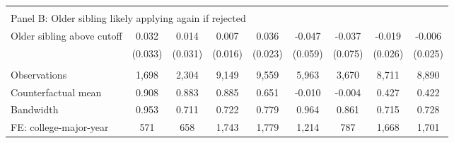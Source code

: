 {{\begin{tabular}{lcccccccc}
&  &  &  & & & & & &    \\
\multicolumn{9}{l}{Panel B: Older sibling likely applying again if rejected} \\
Older sibling above cutoff&       0.032   &       0.014   &       0.007   &       0.036   &      -0.047   &      -0.037   &      -0.019   &      -0.006   \\
                    &     (0.033)   &     (0.031)   &     (0.016)   &     (0.023)   &     (0.059)   &     (0.075)   &     (0.026)   &     (0.025)   \\
                    &               &               &               &               &               &               &               &               \\
Observations        &       1,698   &       2,304   &       9,149   &       9,559   &       5,963   &       3,670   &       8,711   &       8,890   \\
Counterfactual mean &       0.908   &       0.883   &       0.885   &       0.651   &      -0.010   &      -0.004   &       0.427   &       0.422   \\
Bandwidth           &       0.953   &       0.711   &       0.722   &       0.779   &       0.964   &       0.861   &       0.715   &       0.728   \\
FE: college-major-year&         571   &         658   &       1,743   &       1,779   &       1,214   &         787   &       1,668   &       1,701   \\
 

\bottomrule
\end{tabular}
}
}

